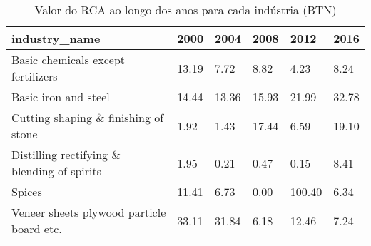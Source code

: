 \begin{table}
\centering
\caption{Valor do RCA ao longo dos anos para cada indústria (BTN)}
\begin{tabular}{p{6cm}p{1.5cm}p{1.5cm}p{1.5cm}p{1.5cm}p{1.5cm}}
\toprule
                              industry\_name &  2000 &  2004 &  2008 &   2012 &  2016 \\
\midrule
         Basic chemicals except fertilizers & 13.19 &  7.72 &  8.82 &   4.23 &  8.24 \\
                       Basic iron and steel & 14.44 & 13.36 & 15.93 &  21.99 & 32.78 \\
       Cutting shaping \& finishing of stone &  1.92 &  1.43 & 17.44 &   6.59 & 19.10 \\
Distilling rectifying \& blending of spirits &  1.95 &  0.21 &  0.47 &   0.15 &  8.41 \\
                                     Spices & 11.41 &  6.73 &  0.00 & 100.40 &  6.34 \\
  Veneer sheets plywood particle board etc. & 33.11 & 31.84 &  6.18 &  12.46 &  7.24 \\
\bottomrule
\end{tabular}
\end{table}
